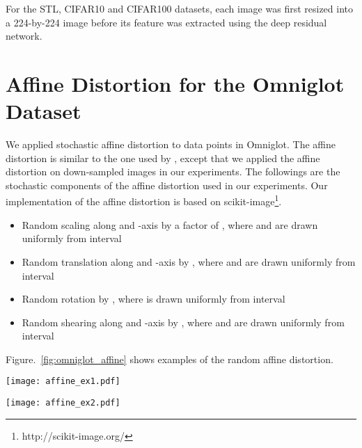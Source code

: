 \documentclass{article}
\theoremstyle{plain}
\newcounter{long}
\begin{document}
For the STL, CIFAR10 and CIFAR100 datasets, each image was first resized into a 224-by-224 image before its feature was extracted using the deep residual network.

\section{Affine Distortion for the Omniglot Dataset} \label{app:augmentation}
We applied stochastic affine distortion to data points in Omniglot. The affine distortion is similar to the one used by \citet{koch2015siamese}, except that we applied the affine distortion on down-sampled images in our experiments. The followings are the stochastic components of the affine distortion used in our experiments. Our implementation of the affine distortion is based on scikit-image\footnote{http://scikit-image.org/}.
\begin{itemize}
\item Random scaling along  and -axis by a factor of , where  and  are drawn uniformly from interval 
\item Random translation along  and -axis by , where  and  are drawn uniformly from interval 
\item Random rotation by , where  is drawn uniformly from interval 
\item Random shearing along  and -axis by , where  and  are drawn uniformly from interval 
\end{itemize}

Figure.~\ref{fig:omniglot_affine} shows examples of the random affine distortion.

\begin{figure*}[t]
\begin{minipage}[t]{0.5\hsize}
\begin{center}
\centerline{\texttt{[image: affine\_ex1.pdf]}}
\label{image}
\end{center}
\end{minipage}
\begin{minipage}[t]{0.5\hsize}
\begin{center}
\centerline{\texttt{[image: affine\_ex2.pdf]}}
\label{image}
\end{center}
\end{minipage}
\vspace{-1cm}
\caption{Examples of the random affine distortion used in our experiments. Images in the top left side are stochastically transformed using the affine distortion.}\label{fig:omniglot_affine}
\end{figure*} 
\end{document}
